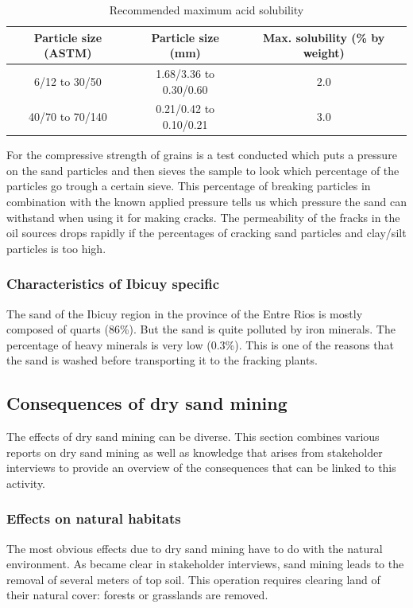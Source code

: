 \begin{table}[h!]
\centering
\begin{tabular}{|c|c|c|}
\hline
\textbf{Particle size (ASTM)} & \textbf{Particle size (mm)} & \textbf{Max. solubility (\% by weight)} \\ \hline
6/12 to 30/50 & 1.68/3.36 to 0.30/0.60 & 2.0 \\ \hline
40/70 to 70/140 & 0.21/0.42 to 0.10/0.21 & 3.0 \\ \hline
\end{tabular}
\caption{Recommended maximum acid solubility \autocite{secretariadepoliticamineraArenasParaFracking2019}}
\label{tab:acid}
\end{table}

For the compressive strength of grains is a test conducted which puts a pressure on the sand particles and then sieves the sample to look which percentage of the particles go trough a certain sieve. This percentage of breaking particles in combination with the known applied pressure tells us which pressure the sand can withstand when using it for making cracks.
The permeability of the fracks in the oil sources drops rapidly if the percentages of cracking sand particles and clay/silt particles is too high. 

\subsubsection{Characteristics of Ibicuy specific}

The sand of the Ibicuy region in the province of the Entre Rios is mostly composed of quarts (86\%). But the sand is quite polluted by iron minerals. The percentage of heavy minerals is very low (0.3\%). This is one of the reasons that the sand is washed before transporting it to the fracking plants. 

\subsection{Consequences of dry sand mining}
The effects of dry sand mining can be diverse. This section combines various reports on dry sand mining as well as knowledge that arises from stakeholder interviews to provide an overview of the consequences that can be linked to this activity.

\subsubsection{Effects on natural habitats}
The most obvious effects due to dry sand mining have to do with the natural environment. As became clear in stakeholder interviews, sand mining leads to the removal of several meters of top soil. This operation requires clearing land of their natural cover: forests or grasslands are removed.

